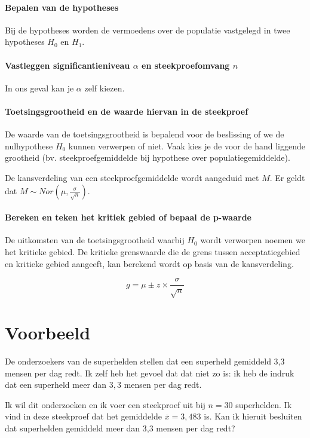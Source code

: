   \paragraph{Bepalen van de hypotheses}
  Bij de hypotheses worden de vermoedens over de populatie vastgelegd in twee hypotheses $H_{0}$ en $H_{1}$.
  \paragraph{Vastleggen significantieniveau $\alpha$ en steekproefomvang $n$}
  In ons geval kan je $\alpha$ zelf kiezen.
  \paragraph{Toetsingsgrootheid en de waarde hiervan in de steekproef}
  De waarde van de toetsingsgrootheid is bepalend voor de beslissing of we de nulhypothese $H_{0}$ kunnen verwerpen of niet. Vaak kies je de voor de hand liggende grootheid (bv. steekproefgemiddelde bij hypothese over populatiegemiddelde).

  De kansverdeling van een steekproefgemiddelde wordt aangeduid met $M$. Er geldt dat $M \sim Nor( \mu, \frac{\sigma}{\sqrt{n}})$.

  \paragraph{Bereken en teken het kritiek gebied of bepaal de p-waarde}
  De uitkomsten van de toetsingsgrootheid waarbij $H_{0}$ wordt verworpen noemen we het kritieke gebied. De kritieke grenswaarde die de grens tussen acceptatiegebied en kritieke gebied aangeeft, kan berekend wordt op basis van de kansverdeling.

\[ g = \mu \pm z \times \frac{\sigma}{\sqrt{n}} \]

\section{Voorbeeld}
\begin{example}
  De onderzoekers van de superhelden stellen dat een superheld gemiddeld 3,3 mensen per dag redt. Ik zelf heb het gevoel dat dat niet zo is: ik heb de indruk dat een superheld meer dan $3,3$ mensen per dag redt.
\end{example}

Ik wil dit onderzoeken en ik voer een steekproef uit bij $n = 30$ superhelden. Ik vind in deze steekproef dat het gemiddelde $\overline{x} = 3,483$ is. Kan ik hieruit besluiten dat superhelden gemiddeld meer dan 3,3 mensen per dag redt?

